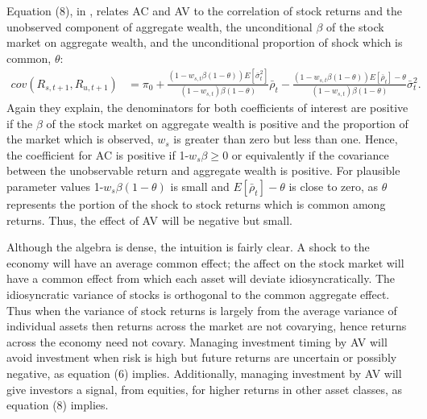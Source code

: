 Equation (8), in \cite{pollet_average_2010}, relates AC and AV to the correlation of stock returns and the unobserved component of aggregate wealth, the unconditional $\beta$ of the stock market on aggregate wealth, and the unconditional proportion of shock which is common, $\theta$: 
\begin{align*}
cov(R_{s,t+1},R_{u,t+1}) &= \pi_{0} + \frac{(1-w_{s,t}\beta(1-\theta))E[\bar{\sigma}^{2}_{t}]}{(1-w_{s,t})\beta(1-\theta)}\bar{\rho}_{t}- \frac{(1-w_{s,t}\beta(1-\theta))E[\bar{\rho}_{t}]-\theta}{(1-w_{s,t})\beta(1-\theta)}\bar{\sigma}^{2}_{t}.
\end{align*}
Again they explain, the denominators for both coefficients of interest are positive if the $\beta$ of the stock market on aggregate wealth is positive and the proportion of the market which is observed, $w_{s}$ is greater than zero but less than one. Hence, the coefficient for AC is positive if 1-$w_{s}\beta \geq 0$ or equivalently if the covariance between the unobservable return and aggregate wealth is positive. For plausible parameter values 1-$w_{s}\beta(1-\theta)$ is small and $E[\bar{\rho}_{t}]-\theta$ is close to zero, as $\theta$ represents the portion of the shock to stock returns which is common among returns. Thus, the effect of AV will be negative but small. 

Although the algebra is dense, the intuition is fairly clear. A shock to the economy will have an average common effect; the affect on the stock market will have a common effect from which each asset will deviate idiosyncratically. The idiosyncratic variance of stocks is orthogonal to the common aggregate effect. Thus when the variance of stock returns is largely from the average variance of individual assets then returns across the market are not covarying, hence returns across the economy need not covary. Managing investment timing by AV will avoid investment when risk is high but future returns are uncertain or possibly negative, as equation (6) implies. Additionally, managing investment by AV will give investors a signal, from equities, for higher returns in other asset classes, as equation (8) implies.

